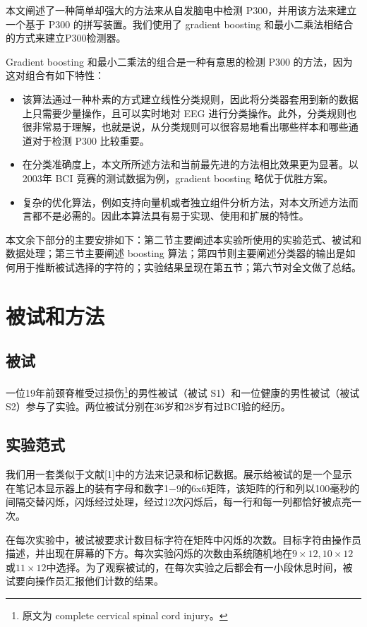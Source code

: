 \documentclass[a4paper]{ecust_thesis_translation}
\renewcommand\![1]{\immature{#1}}
\begin{document}
本文阐述了一种简单却强大的方法来从自发脑电中检测 P300，并用该方法来建立一个基于 P300 的拼写装置。我们使用了 gradient boosting 和最小二乘法相结合的方式来建立P300检测器。

Gradient boosting 和最小二乘法的组合是一种有意思的检测 P300 的方法，因为这对组合有如下特性：

\begin{itemize}
  \item 该算法通过一种朴素的方式建立线性分类规则，因此将分类器套用到新的数据上只需要少量操作，且可以实时地对 EEG 进行分类操作。此外，分类规则也很非常易于理解，也就是说，从分类规则可以很容易地看出哪些样本和哪些通道对于检测 P300 比较重要。
  \item 在分类准确度上，本文所所述方法和当前最先进的方法相比效果更为显著。以2003年 BCI 竞赛的测试数据为例，gradient boosting 略优于优胜方案。
  \item 复杂的优化算法，例如支持向量机或者独立组件分析方法，对本文所述方法而言都不是必需的。因此本算法具有易于实现、使用和扩展的特性。
\end{itemize}

本文余下部分的主要安排如下：第二节主要阐述本实验所使用的实验范式、被试和数据处理；第三节主要阐述 boosting 算法；第四节则主要阐述分类器的输出是如何用于推断被试选择的字符的；实验结果呈现在第五节；第六节对全文做了总结。

\section{被试和方法}
\subsection{被试}
一位19年前颈脊椎受过损伤\footnote{原文为 complete cervical spinal cord injury。}的男性被试（被试 S1）和一位健康的男性被试（被试 S2）参与了实验。两位被试分别在36岁和28岁有过BCI验的经历。

\subsection{实验范式}
我们用一套类似于文献[1]中的方法来记录和标记数据。展示给被试的是一个显示在笔记本显示器上的装有字母和数字1$-$9的6x6矩阵，该矩阵的行和列以100毫秒的间隔交替闪烁，闪烁经过处理，经过12次闪烁后，每一行和每一列都恰好被点亮一次。

在每次实验中，被试被要求计数目标字符在矩阵中闪烁的次数。目标字符由操作员描述，并出现在屏幕的下方。每次实验闪烁的次数由系统随机地在$9\times 12, 10\times 12$或$11\times 12$中选择。为了观察被试的，在每次实验之后都会有一小段休息时间，被试要向操作员汇报他们计数的结果。
\end{document}
